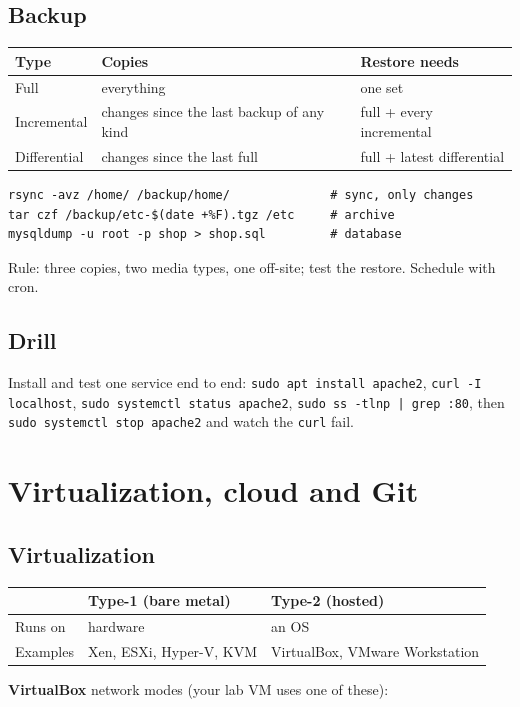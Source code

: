\documentclass[11pt,a4paper]{article}
\begin{document}
\subsection{Backup}
\begin{center}\small\renewcommand{\arraystretch}{1.18}\setlength{\tabcolsep}{9pt}
\begin{tabularx}{\linewidth}{@{}l>{\raggedright\arraybackslash}X>{\raggedright\arraybackslash}X@{}}
\toprule
\textbf{\color{slate}Type} & \textbf{\color{slate}Copies} & \textbf{\color{slate}Restore needs} \\ \midrule
Full & everything & one set \\
Incremental & changes since the last backup of any kind & full + every incremental \\
Differential & changes since the last full & full + latest differential \\
\bottomrule
\end{tabularx}\end{center}
\begin{lstlisting}
rsync -avz /home/ /backup/home/              # sync, only changes
tar czf /backup/etc-$(date +%F).tgz /etc     # archive
mysqldump -u root -p shop > shop.sql         # database
\end{lstlisting}
Rule: three copies, two media types, one off-site; test the restore. Schedule with cron.

\subsection*{Drill}
Install and test one service end to end: \texttt{sudo apt install apache2}, \texttt{curl -I localhost}, \texttt{sudo systemctl status apache2}, \texttt{sudo ss -tlnp | grep :80}, then \texttt{sudo systemctl stop apache2} and watch the \texttt{curl} fail.

\clearpage
\section{Virtualization, cloud and Git}
\subsection{Virtualization}
\begin{center}\small\renewcommand{\arraystretch}{1.18}\setlength{\tabcolsep}{9pt}
\begin{tabularx}{\linewidth}{@{}l>{\raggedright\arraybackslash}X>{\raggedright\arraybackslash}X@{}}
\toprule
\textbf{\color{slate}} & \textbf{\color{slate}Type-1 (bare metal)} & \textbf{\color{slate}Type-2 (hosted)} \\ \midrule
Runs on & hardware & an OS \\
Examples & Xen, ESXi, Hyper-V, KVM & VirtualBox, VMware Workstation \\
\bottomrule
\end{tabularx}\end{center}
\textbf{VirtualBox} network modes (your lab VM uses one of these):
\end{document}

